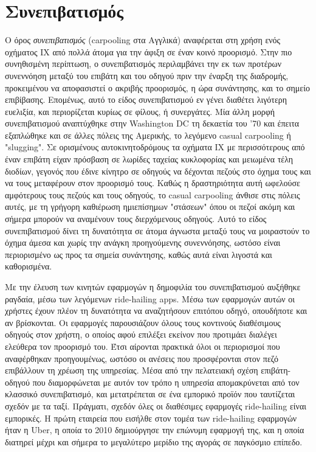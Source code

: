 \documentclass[../thesis.tex]{subfiles}
\begin{document}
\section{Συνεπιβατισμός}
Ο όρος \textit{συνεπιβατισμός} (carpooling στα Αγγλικά) αναφέρεται στη χρήση ενός οχήματος ΙΧ από πολλά άτομα για την άφιξη σε έναν κοινό προορισμό.
Στην πιο συνηθισμένη περίπτωση, ο συνεπιβατισμός περιλαμβάνει την εκ των προτέρων συνεννόηση μεταξύ του επιβάτη και του οδηγού πριν την έναρξη της διαδρομής, προκειμένου να αποφασιστεί ο ακριβής προορισμός, η ώρα συνάντησης, και το σημείο επιβίβασης.
Επομένως, αυτό το είδος συνεπιβατισμού εν γένει διαθέτει λιγότερη ευελιξία, και περιορίζεται κυρίως σε φίλους, ή συνεργάτες.
Μία άλλη μορφή συνεπιβατισμού αναπτύχθηκε στην Washington DC τη δεκαετία του '70 και έπειτα εξαπλώθηκε και σε άλλες πόλεις της Αμερικής, το λεγόμενο casual carpooling ή "slugging".
Σε ορισμένους αυτοκινητοδρόμους τα οχήματα ΙΧ με περισσότερους από έναν επιβάτη είχαν πρόσβαση σε λωρίδες ταχείας κυκλοφορίας και μειωμένα τέλη διοδίων, γεγονός που έδινε κίνητρο σε οδηγούς να δέχονται πεζούς στο όχημα τους και να τους μεταφέρουν στον προορισμό τους.
Καθώς η δραστηριότητα αυτή ωφελούσε αμφότερους τους πεζούς και τους οδηγούς, το casual carpooling άνθισε στις πόλεις αυτές, με τη γρήγορη καθιέρωση ημιεπίσημων "στάσεων" όπου οι πεζοί ακόμη και σήμερα μπορούν να αναμένουν τους διερχόμενους οδηγούς.
Αυτό το είδος συνεπιβατισμού δίνει τη δυνατότητα σε άτομα άγνωστα μεταξύ τους να μοιραστούν το όχημα άμεσα και χωρίς την ανάγκη προηγούμενης συνεννόησης, ωστόσο είναι περιορισμένο ως προς τα σημεία συνάντησης, καθώς αυτά είναι λιγοστά και καθορισμένα.

Με την έλευση των κινητών εφαρμογών η δημοφιλία του συνεπιβατισμού αυξήθηκε ραγδαία, μέσω των λεγόμενων ride-hailing apps.
Μέσω των εφαρμογών αυτών οι χρήστες έχουν πλέον τη δυνατότητα να αναζητήσουν επιτόπου οδηγό, οπουδήποτε και αν βρίσκονται.
Οι εφαρμογές παρουσιάζουν όλους τους κοντινούς διαθέσιμους οδηγούς στον χρήστη, ο οποίος αφού επιλέξει εκείνον που προτιμάει διαλέγει ελεύθερα τον προορισμό του.
Έτσι αίρονται πρακτικά όλοι οι περιορισμοί που αναφέρθηκαν προηγουμένως, ωστόσο οι ανέσεις που προσφέρονται στον πεζό επιβάλλουν τη χρέωση της υπηρεσίας.
Μέσα από την πελατειακή σχέση επιβάτη-οδηγού που διαμορφώνεται με αυτόν τον τρόπο η υπηρεσία απομακρύνεται από τον κλασσικό συνεπιβατισμό, και μετατρέπεται σε ένα εμπορικό προϊόν που ταυτίζεται σχεδόν με τα ταξί.
Πράγματι, σχεδόν όλες οι διαθέσιμες εφαρμογές ride-hailing είναι εμπορικές.
Η πρώτη εταιρεία που εισήλθε στον τομέα των ride-hailing εφαρμογών ήταν η Uber, η οποία το 2010 δημιούργησε την επώνυμη εφαρμογή της, και η οποία διατηρεί μέχρι και σήμερα το μεγαλύτερο μερίδιο της αγοράς σε παγκόσμιο επίπεδο.
\end{document}
